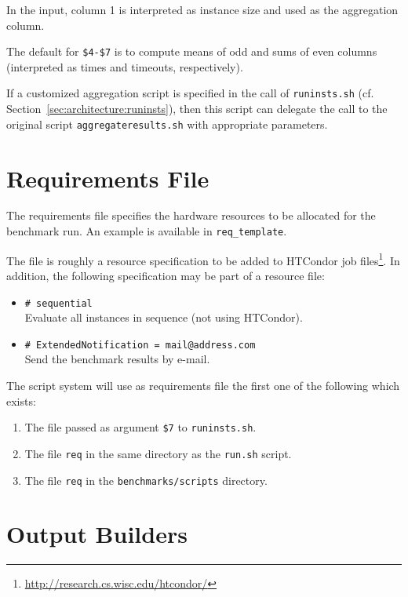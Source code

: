 \documentclass[a4paper]{article}
\begin{document}
			In the input, column 1 is interpreted as instance size and used as the aggregation column.

			The default for {\tt \$4-\$7}
			is to compute means of odd and sums of even columns (interpreted as times and timeouts, respectively).

			If a customized aggregation script is specified in the call of {\tt runinsts.sh} (cf. Section~\ref{sec:architecture:runinsts}),
			then this script can delegate the call to the original script {\tt aggregateresults.sh} with appropriate parameters.

	\section{Requirements File}
	\label{sec:reqfile}
			
		The requirements file specifies the hardware resources to be allocated
		for the benchmark run.
		An example is available in {\tt req\_template}.
		
		The file is roughly a resource specification to be added to
		HTCondor job files\footnote{\url{http://research.cs.wisc.edu/htcondor/}}.
		In addition, the following specification may be part of a resource file:
		\begin{itemize}
			\item {\tt \# sequential} \\
				Evaluate all instances in sequence (not using HTCondor).
			\item {\tt \# ExtendedNotification = mail@address.com} \\
				 Send the benchmark results by e-mail. 
		\end{itemize}

		The script system will use as requirements file the first one of the following which exists:
		\begin{enumerate}
			\item The file passed as argument {\tt \$7} to {\tt runinsts.sh}.
			\item The file {\tt req} in the same directory as the {\tt run.sh} script.
			\item The file {\tt req} in the {\tt benchmarks/scripts} directory.
		\end{enumerate}

	
	\section{Output Builders}
	\label{sec:outputbuilder}
			
\end{document}
